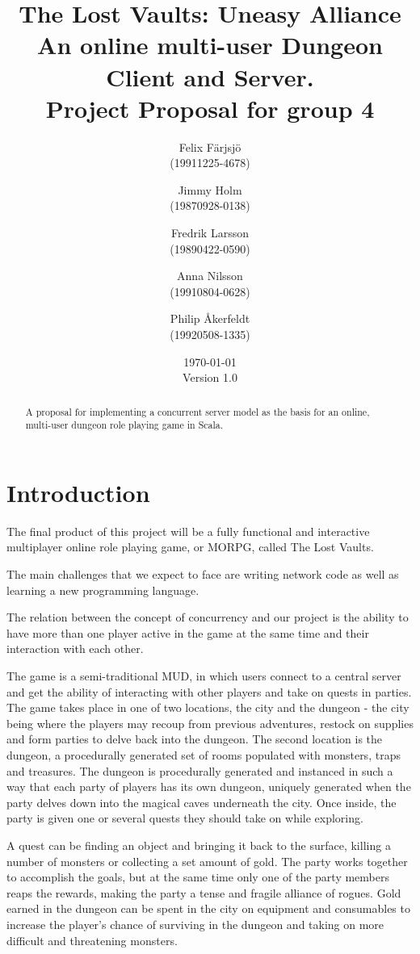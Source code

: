 \documentclass[a4paper]{article}
\title{The Lost Vaults: Uneasy Alliance\\\small{An online multi-user Dungeon Client and Server.}\\\small{Project Proposal for group 4}}
\author{Felix Färjsjö\\(19911225-4678) \and Jimmy Holm\\(19870928-0138) \and Fredrik Larsson\\(19890422-0590) \and Anna Nilsson\\(19910804-0628) \and Philip Åkerfeldt\\(19920508-1335)}
\date{\today\\Version 1.0}
\begin{document}
\maketitle
\newpage
\begin{abstract}
A proposal for implementing a concurrent server model as the basis for an online, multi-user dungeon role playing game in Scala.
\end{abstract}

\tableofcontents

\section{Introduction}
The final product of this project will be a fully functional and interactive multiplayer online role playing game, or MORPG, called The Lost Vaults.

The main challenges that we expect to face are writing network code as well as learning a new programming language.

The relation between the concept of concurrency and our project is the ability to have more than one player active in the game at the same time and their interaction with each other.

The game is a semi-traditional MUD, in which users connect to a central server and get the ability of interacting with other players and take on quests in parties. The game takes place in one of two locations, the city and the dungeon - the city being where the players may recoup from previous adventures, restock on supplies and form parties to delve back into the dungeon. The second location is the dungeon, a procedurally generated set of rooms populated with monsters, traps and treasures. The dungeon is procedurally generated and instanced in such a way that each party of players has its own dungeon, uniquely generated when the party delves down into the magical caves underneath the city. Once inside, the party is given one or several quests they should take on while exploring. 

A quest can be finding an object and bringing it back to the surface, killing a number of monsters or collecting a set amount of gold. The party works together to accomplish the goals, but at the same time only one of the party members reaps the rewards, making the party a tense and fragile alliance of rogues. Gold earned in the dungeon can be spent in the city on equipment and consumables to increase the player’s chance of surviving in the dungeon and taking on more difficult and threatening monsters.
\end{document}
